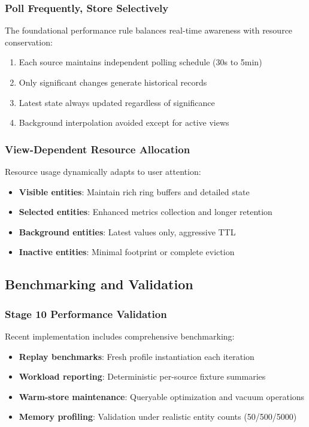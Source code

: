 \documentclass[12pt,a4paper]{article}
\begin{document}
\subsubsection{Poll Frequently, Store Selectively}
The foundational performance rule balances real-time awareness with resource conservation:

\begin{enumerate}
\item Each source maintains independent polling schedule (30s to 5min)
\item Only significant changes generate historical records
\item Latest state always updated regardless of significance
\item Background interpolation avoided except for active views
\end{enumerate}

\subsubsection{View-Dependent Resource Allocation}
Resource usage dynamically adapts to user attention:

\begin{itemize}
\item \textbf{Visible entities}: Maintain rich ring buffers and detailed state
\item \textbf{Selected entities}: Enhanced metrics collection and longer retention
\item \textbf{Background entities}: Latest values only, aggressive TTL
\item \textbf{Inactive entities}: Minimal footprint or complete eviction
\end{itemize}

\subsection{Benchmarking and Validation}

\subsubsection{Stage 10 Performance Validation}
Recent implementation includes comprehensive benchmarking:

\begin{itemize}
\item \textbf{Replay benchmarks}: Fresh profile instantiation each iteration
\item \textbf{Workload reporting}: Deterministic per-source fixture summaries
\item \textbf{Warm-store maintenance}: Queryable optimization and vacuum operations
\item \textbf{Memory profiling}: Validation under realistic entity counts (50/500/5000)
\end{itemize}
\end{document}
